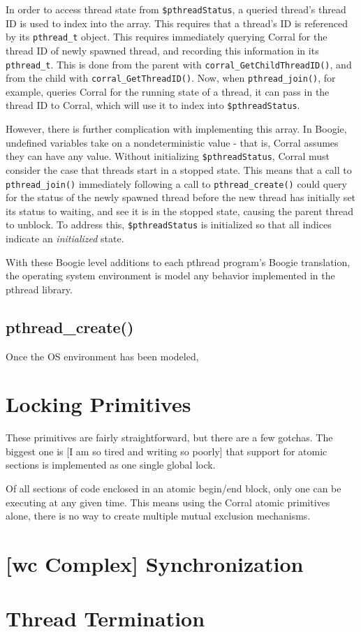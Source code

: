 In order to access thread state from \lstinline|$pthreadStatus|, a
queried thread's thread ID is used to index into the array.  This
requires that a thread's ID is referenced by its
\lstinline|pthread_t| object.  This requires immediately querying
Corral for the thread ID of newly spawned thread, and recording this
information in its \lstinline|pthread_t|.  This is done from the
parent with \lstinline|corral_GetChildThreadID()|, and from the child
with \lstinline|corral_GetThreadID()|.  Now, when
\lstinline|pthread_join()|, for example, queries Corral for the
running state of a thread, it can pass in the thread ID to Corral,
which will use it to index into \lstinline|$pthreadStatus|.

However, there is further complication with implementing this
array. In Boogie, undefined variables take on a nondeterministic value
- that is, Corral assumes they can have any value.  Without
initializing \lstinline|$pthreadStatus|, Corral must consider the case
that threads start in a stopped state.  This means that a call to
\lstinline|pthread_join()| immediately following a call to
\lstinline|pthread_create()| could query for the status of the newly
spawned thread before the new thread has initially set its status to
waiting, and see it is in the stopped state, causing the parent thread
to unblock.  To address this, \lstinline|$pthreadStatus| is
initialized so that all indices indicate an \emph{initialized} state.

With these Boogie level additions to each pthread program's Boogie
translation, the operating system environment is model any behavior
implemented in the pthread library.

\subsection{pthread\_create()}
Once the OS environment has been modeled, 

\section{Locking Primitives}
These primitives are fairly straightforward, but there are a few
gotchas.  The biggest one is [I am so tired and writing so poorly]
that support for atomic sections is implemented as one single global
lock.   

Of all sections of code enclosed in an atomic begin/end block, only
one can be executing at any given time.  This means using the Corral
atomic primitives alone, there is no way to create multiple mutual
exclusion mechanisms. 

\section{[wc Complex] Synchronization}

\section{Thread Termination}


